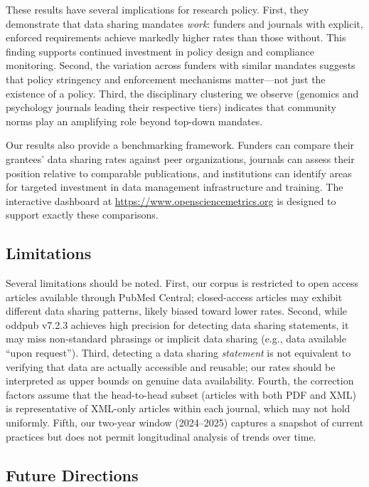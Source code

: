 These results have several implications for research policy. First, they demonstrate that data sharing mandates \emph{work}: funders and journals with explicit, enforced requirements achieve markedly higher rates than those without. This finding supports continued investment in policy design and compliance monitoring. Second, the variation across funders with similar mandates suggests that policy stringency and enforcement mechanisms matter---not just the existence of a policy. Third, the disciplinary clustering we observe (genomics and psychology journals leading their respective tiers) indicates that community norms play an amplifying role beyond top-down mandates.

Our results also provide a benchmarking framework. Funders can compare their grantees' data sharing rates against peer organizations, journals can assess their position relative to comparable publications, and institutions can identify areas for targeted investment in data management infrastructure and training. The interactive dashboard at \url{https://www.opensciencemetrics.org} is designed to support exactly these comparisons.

\subsection{Limitations}

Several limitations should be noted. First, our corpus is restricted to open access articles available through PubMed Central; closed-access articles may exhibit different data sharing patterns, likely biased toward lower rates. Second, while oddpub v7.2.3 achieves high precision for detecting data sharing statements, it may miss non-standard phrasings or implicit data sharing (e.g., data available ``upon request''). Third, detecting a data sharing \emph{statement} is not equivalent to verifying that data are actually accessible and reusable; our rates should be interpreted as upper bounds on genuine data availability. Fourth, the correction factors assume that the head-to-head subset (articles with both PDF and XML) is representative of XML-only articles within each journal, which may not hold uniformly. Fifth, our two-year window (2024--2025) captures a snapshot of current practices but does not permit longitudinal analysis of trends over time.

\subsection{Future Directions}

